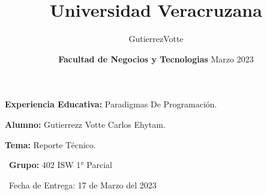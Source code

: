 \documentclass{article}
\title{\textbf{Universidad Veracruzana} }
\date{\textbf{Facultad de Negocios y Tecnologias} }
\begin{document}
\maketitle
\textsf{\Large \textbf{Experiencia Educativa:} Paradigmas De Programación.\\}
 
\maketitle
\textsf{\Large \textbf{Alumno:} Gutierrezz Votte Carlos Ehytam. \\}

\maketitle
\textsf{\Large \textbf{Tema:} Reporte Técnico. \\}

\textsf{\ \textbf{Grupo:} 402 ISW 1° Parcial \\}

\maketitle

\textsf{\ Fecha de Entrega: 17 de Marzo del 2023 \\}

\author{GutierrezVotte}
\date{Marzo 2023}

\newpage
\end{document}
